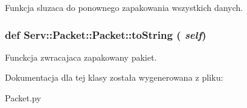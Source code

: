 \label{class_serv_1_1_packet_1_1_packet_a6dab330b602405f42b3fe090863e5c1e}
\begin{DoxyVerb}Funkcja sluzaca do ponownego zapakowania wszystkich danych.\end{DoxyVerb}
 \hypertarget{class_serv_1_1_packet_1_1_packet_a2738b48c8c177150338082c936c823dc}{
\subsubsection[{toString}]{\setlength{\rightskip}{0pt plus 5cm}def Serv::Packet::Packet::toString ( {\em self})}}
\label{class_serv_1_1_packet_1_1_packet_a2738b48c8c177150338082c936c823dc}
\begin{DoxyVerb}Funckcja zwracajaca zapakowany pakiet.\end{DoxyVerb}
 

Dokumentacja dla tej klasy została wygenerowana z pliku:\begin{DoxyCompactItemize}
\item 
Packet.py\end{DoxyCompactItemize}
